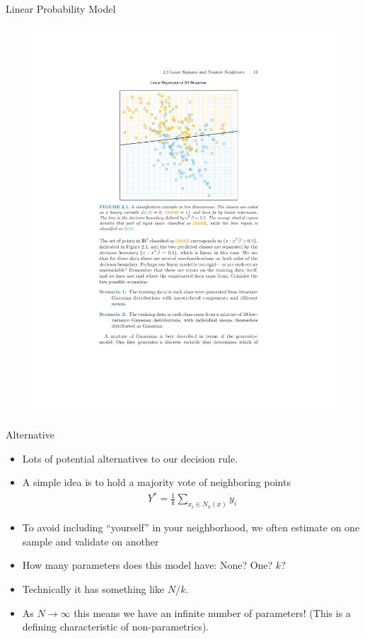\begin{frame}{Linear Probability Model}
  \vspace{-15pt}
    
  \begin{figure}[htbp]
  \begin{center}
  \includegraphics[height = .95\textheight]{./resources/classifierOLS.pdf}
  \label{classOLS}
  \end{center}
  \end{figure}
\end{frame}


\begin{frame}{Alternative}
\begin{itemize}
\item Lots of potential alternatives to our decision rule.
\item A simple idea is to hold a majority vote of neighboring points 
\begin{eqnarray*}
Y^{*} = \frac{1}{k} \sum_{x_i \in N_k(x)} y_i
\end{eqnarray*}
\item To avoid including ``yourself'' in your neighborhood, we often estimate on one sample and validate on another
\item How many parameters does this model have: None? One? $k$? 
\item Technically it has something like $N/k$.
\item As $N \rightarrow \infty$ this means we have an infinite number of parameters! (This is a defining characteristic of non-parametrics).
\end{itemize}
\end{frame}


